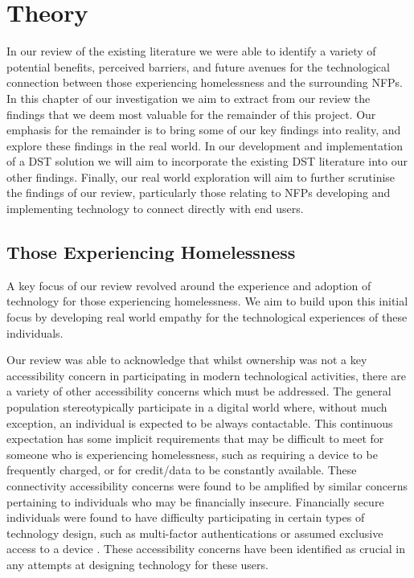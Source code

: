 \chapter{Theory}

In our review of the existing literature we were able to identify a variety of potential benefits, perceived barriers, and future avenues for the technological connection between those experiencing homelessness and the surrounding NFPs. In this chapter of our investigation we aim to extract from our review the findings that we deem most valuable for the remainder of this project. Our emphasis for the remainder is to bring some of our key findings into reality, and explore these findings in the real world. In our development and implementation of a DST solution we will aim to incorporate the existing DST literature into our other findings. Finally, our real world exploration will aim to further scrutinise the findings of our review, particularly those relating to NFPs developing and implementing technology to connect directly with end users.

\section{Those Experiencing Homelessness}

A key focus of our review revolved around the experience and adoption of technology for those experiencing homelessness. We aim to build upon this initial focus by developing real world empathy for the technological experiences of these individuals.

Our review was able to acknowledge that whilst ownership was not a key accessibility concern in participating in modern technological activities, there are a variety of other accessibility concerns which must be addressed. The general population stereotypically participate in a digital world where, without much exception, an individual is expected to be always contactable. This continuous expectation has some implicit requirements that may be difficult to meet for someone who is experiencing homelessness, such as requiring a device to be frequently charged, or for credit/data to be constantly available. These connectivity accessibility concerns were found to be amplified by similar concerns pertaining to individuals who may be financially insecure. Financially secure individuals were found to have difficulty participating in certain types of technology design, such as multi-factor authentications or assumed exclusive access to a device \cite{sleeper2019tough}. These accessibility concerns have been identified as crucial in any attempts at designing technology for these users.

